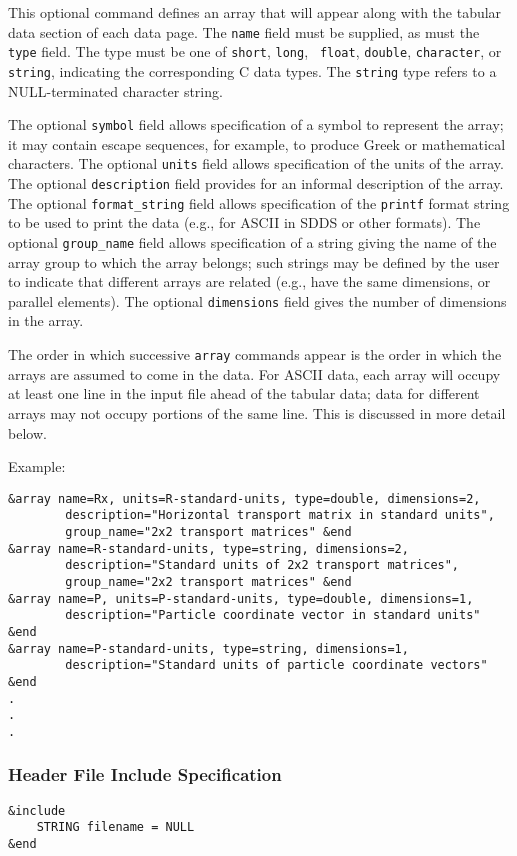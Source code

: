 \documentclass[11pt]{article}
\begin{document}
This optional command defines an array that will appear along with the tabular data section of each data page.  The
{\tt name} field must be supplied, as must the {\tt type} field.  The type must be one of {\tt short}, {\tt long}, {\tt
float}, {\tt double}, {\tt character}, or {\tt string}, indicating the corresponding C data types.  The {\tt string}
type refers to a NULL-terminated character string.

The optional {\tt symbol} field allows specification of a symbol to represent the array; it may contain escape
sequences, for example, to produce Greek or mathematical characters.  The optional {\tt units} field allows
specification of the units of the array.  The optional {\tt description} field provides for an informal description
of the array.  The optional {\tt format\_string} field allows specification of the {\tt printf} format string to be used to
print the data (e.g., for ASCII in SDDS or other formats).  The optional {\tt group\_name} field allows
specification of a string giving the name of the array group to which the array belongs; such strings may be defined
by the user to indicate that different arrays are related (e.g., have the same dimensions, or parallel elements).
The optional {\tt dimensions} field gives the number of dimensions in the array.

The order in which successive {\tt array} commands appear is the order in which the arrays are assumed to come in
the data.  For ASCII data, each array will occupy at least one line in the input file ahead of the tabular data;
data for different arrays may not occupy portions of the same line.  This is discussed in more detail below.

Example:
\begin{verbatim}
&array name=Rx, units=R-standard-units, type=double, dimensions=2,
        description="Horizontal transport matrix in standard units",
        group_name="2x2 transport matrices" &end
&array name=R-standard-units, type=string, dimensions=2, 
        description="Standard units of 2x2 transport matrices",
        group_name="2x2 transport matrices" &end
&array name=P, units=P-standard-units, type=double, dimensions=1, 
        description="Particle coordinate vector in standard units" &end
&array name=P-standard-units, type=string, dimensions=1, 
        description="Standard units of particle coordinate vectors" &end
.
.
.
\end{verbatim}


\subsubsection{Header File Include Specification}
\begin{verbatim}
&include
    STRING filename = NULL
&end
\end{verbatim}
\end{document}
